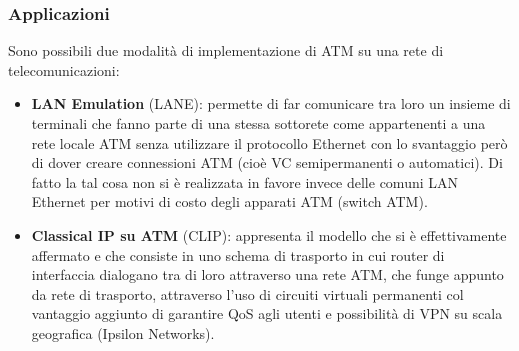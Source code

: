 \documentclass[8pt]{extarticle}
\begin{document}
\subsubsection{Applicazioni}
Sono possibili due modalità di implementazione di ATM su una rete di telecomunicazioni:\\
\begin{itemize}
    \item \textbf{LAN Emulation} (LANE): permette di far comunicare tra loro un insieme di terminali che 
    fanno parte di una stessa sottorete come appartenenti a una rete locale ATM senza utilizzare il 
    protocollo Ethernet con lo svantaggio però di dover creare connessioni ATM (cioè VC semipermanenti o 
    automatici). Di fatto la tal cosa non si è realizzata in favore invece delle comuni LAN Ethernet per 
    motivi di costo degli apparati ATM (switch ATM).
    \item \textbf{Classical IP su ATM} (CLIP): appresenta il modello che si è effettivamente affermato e 
    che consiste in uno schema di trasporto in cui router di interfaccia dialogano tra di loro attraverso 
    una rete ATM, che funge appunto da rete di trasporto, attraverso l'uso di circuiti virtuali permanenti 
    col vantaggio aggiunto di garantire QoS agli utenti e possibilità di VPN su scala geografica 
    (Ipsilon Networks).
\end{itemize}
\end{document}
